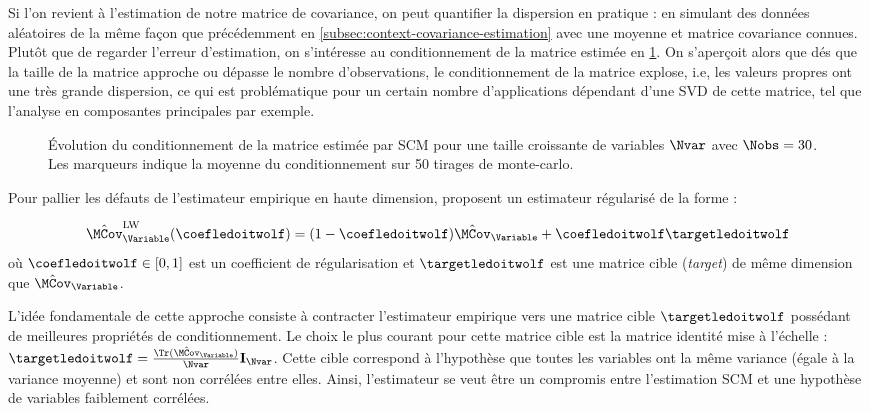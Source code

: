 Si l'on revient à l'estimation de notre matrice de covariance, on peut quantifier la dispersion en pratique : en simulant des données aléatoires de la même façon que précédemment en \cref{subsec:context-covariance-estimation} avec une moyenne et matrice covariance connues. Plutôt que de regarder l'erreur d'estimation, on s'intéresse au conditionnement de la matrice estimée en \cref{fig:context-estimation-cond}. On s'aperçoit alors que dés que la taille de la matrice approche ou dépasse le nombre d'observations, le conditionnement de la matrice explose, i.e, les valeurs propres ont une très grande dispersion, ce qui est problématique pour un certain nombre d'applications dépendant d'une SVD de cette matrice, tel que l'analyse en composantes principales par exemple. \\

\begin{figure}[h]
  \begin{center}
        
      \end{center}
  \provScmcondQR[.5cm]
  \caption{\'Evolution du conditionnement de la matrice estimée  par SCM pour une taille croissante de variables $\Nvar$ avec $\Nobs=30$. Les marqueurs indique la moyenne du conditionnement sur 50 tirages de monte-carlo. \provScmcond}
  \label{fig:context-estimation-cond}
\end{figure}



Pour pallier les défauts de l'estimateur empirique en haute dimension,  proposent un estimateur régularisé de la forme :

\begin{definition}
\begin{equation}
  \hat{\MCov}_\Variable^{\text{LW}}(\coefledoitwolf) = (1-\coefledoitwolf) \hat{\MCov}_\Variable + \coefledoitwolf \targetledoitwolf
\label{eq:context-ledoit-wolf}
\end{equation}
où $\coefledoitwolf \in [0,1]$ est un coefficient de régularisation et $\targetledoitwolf$ est une matrice cible (\textit{target}) de même dimension que $\hat{\MCov}_\Variable$.
\end{definition}

L'idée fondamentale de cette approche consiste à contracter l'estimateur empirique vers une matrice cible $\targetledoitwolf$ possédant de meilleures propriétés de conditionnement. Le choix le plus courant pour cette matrice cible est la matrice identité mise à l'échelle : $\targetledoitwolf = \frac{\Tr(\hat{\MCov}_\Variable)}{\Nvar} \mathbf{I}_\Nvar$. Cette cible correspond à l'hypothèse que toutes les variables ont la même variance (égale à la variance moyenne) et sont non corrélées entre elles. Ainsi, l'estimateur se veut être un compromis entre l'estimation SCM et une hypothèse de variables faiblement corrélées.

